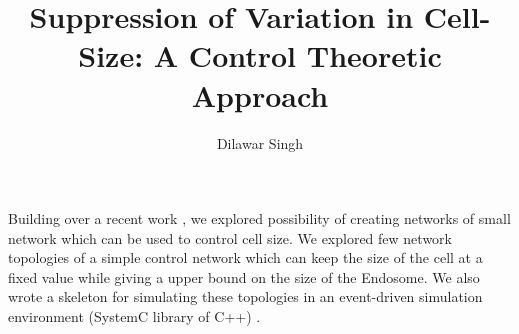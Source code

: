 \documentclass{beamer}
\title{Suppression of Variation in Cell-Size: A Control Theoretic Approach}
\author{Dilawar Singh}
\begin{document}
\begin{frame}

    \maketitle

    Building over a recent work \cite{paulsson}, we explored possibility of
    creating networks of small network which can be used to control cell
    size. We explored few network topologies of a simple control network
    which can keep the size of the cell at a fixed value while giving a
    upper bound on the size of the Endosome. We also wrote a skeleton for
    simulating these topologies in an event-driven simulation environment
    (SystemC library of C++) \cite{github}.

\end{frame}

\end{document}
